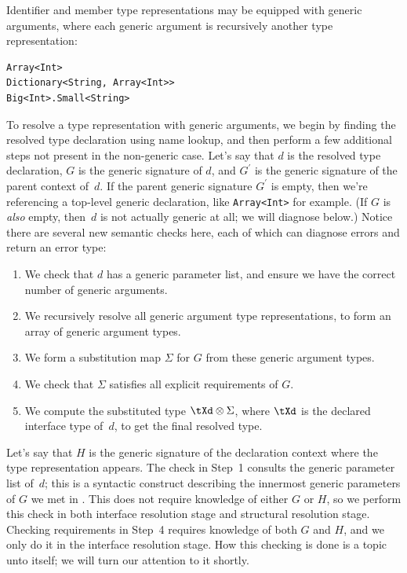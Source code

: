 \documentclass[../generics]{subfiles}
\begin{document}
Identifier and member type representations may be equipped with generic arguments, where each generic argument is recursively another type representation:
\begin{Verbatim}
Array<Int>
Dictionary<String, Array<Int>>
Big<Int>.Small<String>
\end{Verbatim}
To resolve a type representation with generic arguments, we begin by finding the resolved type declaration using name lookup, and then perform a few additional steps not present in the non-generic case. Let's say that $d$ is the resolved type declaration, $G$ is the generic signature of $d$, and $G^\prime$ is the generic signature of the parent context of~$d$. If the parent generic signature $G^\prime$ is empty, then we're referencing a top-level generic declaration, like \texttt{Array<Int>} for example. (If $G$ is \emph{also} empty, then~$d$ is not actually generic at all; we will diagnose below.) Notice there are several new semantic checks here, each of which can diagnose errors and return an error type:
\begin{enumerate}
\item We check that $d$ has a generic parameter list, and ensure we have the correct number of generic arguments.
\item We recursively resolve all generic argument type representations, to form an array of generic argument types.
\item We form a substitution map $\Sigma$ for $G$ from these generic argument types.
\item We check that $\Sigma$ satisfies all explicit requirements of $G$.
\item We compute the substituted type $\tXd\otimes\Sigma$, where $\tXd$ is the declared interface type of~$d$, to get the final resolved type.
\end{enumerate}

Let's say that $H$ is the generic signature of the declaration context where the type representation appears. The check in Step~1 consults the generic parameter list of~$d$; this is a syntactic construct describing the innermost generic parameters of $G$ we met in . This does not require knowledge of either $G$ or $H$, so we perform this check in both interface resolution stage and structural resolution stage. Checking requirements in Step~4 requires knowledge of both $G$ and $H$, and we only do it in the interface resolution stage. How this checking is done is a topic unto itself; we will turn our attention to it shortly.
\end{document}
